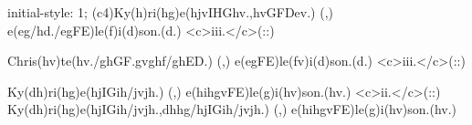 initial-style: 1;
(c4)Ky(h)ri(hg)e(hjvIHGhv.,hvGFDev.) (,) e(eg/hd./egFE)le(f)i(d)son.(d.) <c>iii.</c>(::)

Chris(hv)te(hv./ghGF.gvghf/ghED.) (,) e(egFE)le(fv)i(d)son.(d.) <c>iii.</c>(::)

Ky(dh)ri(hg)e(hjIGih/jvjh.) (,) e(hihgvFE)le(g)i(hv)son.(hv.) <c>ii.</c>(::) Ky(dh)ri(hg)e(hjIGih/jvjh.,dhhg/hjIGih/jvjh.) (,) e(hihgvFE)le(g)i(hv)son.(hv.)
